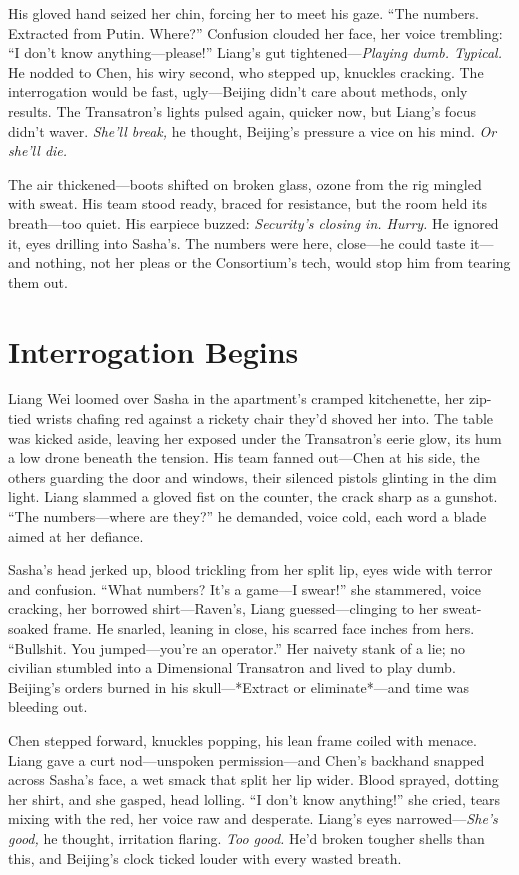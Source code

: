 \documentclass[12pt]{book}
\begin{document}
His gloved hand seized her chin, forcing her to meet his gaze. ``The numbers. Extracted from Putin. Where?'' Confusion clouded her face, her voice trembling: ``I don’t know anything---please!'' Liang’s gut tightened---\textit{Playing dumb. Typical.} He nodded to Chen, his wiry second, who stepped up, knuckles cracking. The interrogation would be fast, ugly---Beijing didn’t care about methods, only results. The Transatron’s lights pulsed again, quicker now, but Liang’s focus didn’t waver. \textit{She’ll break,} he thought, Beijing’s pressure a vice on his mind. \textit{Or she’ll die.}

The air thickened---boots shifted on broken glass, ozone from the rig mingled with sweat. His team stood ready, braced for resistance, but the room held its breath---too quiet. His earpiece buzzed: \textit{Security’s closing in. Hurry.} He ignored it, eyes drilling into Sasha’s. The numbers were here, close---he could taste it---and nothing, not her pleas or the Consortium’s tech, would stop him from tearing them out.

\section{Interrogation Begins}

Liang Wei loomed over Sasha in the apartment’s cramped kitchenette, her zip-tied wrists chafing red against a rickety chair they’d shoved her into. The table was kicked aside, leaving her exposed under the Transatron’s eerie glow, its hum a low drone beneath the tension. His team fanned out—Chen at his side, the others guarding the door and windows, their silenced pistols glinting in the dim light. Liang slammed a gloved fist on the counter, the crack sharp as a gunshot. “The numbers—where are they?” he demanded, voice cold, each word a blade aimed at her defiance.

Sasha’s head jerked up, blood trickling from her split lip, eyes wide with terror and confusion. “What numbers? It’s a game—I swear!” she stammered, voice cracking, her borrowed shirt—Raven’s, Liang guessed—clinging to her sweat-soaked frame. He snarled, leaning in close, his scarred face inches from hers. “Bullshit. You jumped—you’re an operator.” Her naivety stank of a lie; no civilian stumbled into a Dimensional Transatron and lived to play dumb. Beijing’s orders burned in his skull—*Extract or eliminate*—and time was bleeding out.

Chen stepped forward, knuckles popping, his lean frame coiled with menace. Liang gave a curt nod—unspoken permission—and Chen’s backhand snapped across Sasha’s face, a wet smack that split her lip wider. Blood sprayed, dotting her shirt, and she gasped, head lolling. “I don’t know anything!” she cried, tears mixing with the red, her voice raw and desperate. Liang’s eyes narrowed—\textit{She’s good,} he thought, irritation flaring. \textit{Too good.} He’d broken tougher shells than this, and Beijing’s clock ticked louder with every wasted breath.
\end{document}

